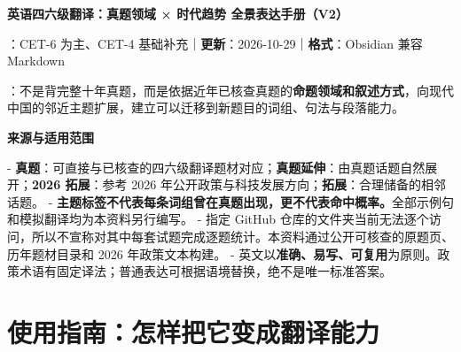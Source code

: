 \documentclass[a4paper,11pt,UTF8,fontset=none]{ctexart}
\begin{document}
\begin{center}\vspace*{4pt}
{\fontsize{18pt}{23pt}\selectfont\bfseries 英语四六级翻译：真题领域 × 时代趋势 全景表达手册（V2）\par}
\vspace{3pt}{\color{AccentBlue}\rule{0.82\linewidth}{1pt}}\end{center}

\begin{tcolorbox}[enhanced,breakable,boxrule=0.35pt,colback=VeryPaleBlue,colframe=AccentBlue!40,left=7pt,right=7pt,top=4pt,bottom=4pt,borderline west={2pt}{0pt}{AccentBlue},before skip=4pt,after skip=6pt]
：CET-6 为主、CET-4 基础补充｜{\bfseries 更新}：2026-10-29｜{\bfseries 格式}：Obsidian 兼容 Markdown\par

：不是背完整十年真题，而是依据近年已核查真题的{\bfseries 命题领域和叙述方式}，向现代中国的邻近主题扩展，建立可以迁移到新题目的词组、句法与段落能力。\par


\end{tcolorbox}

\begin{tcolorbox}[enhanced,breakable,boxrule=0.35pt,colback=VeryPaleBlue,colframe=AccentBlue!40,left=7pt,right=7pt,top=4pt,bottom=4pt,borderline west={2pt}{0pt}{AccentBlue},before skip=4pt,after skip=6pt]
{\bfseries\color{AccentBlue} 来源与适用范围}\par\vspace{1pt}
\noindent - {\bfseries 真题}：可直接与已核查的四六级翻译题材对应；{\bfseries 真题延伸}：由真题话题自然展开；{\bfseries 2026 拓展}：参考 2026 年公开政策与科技发展方向；{\bfseries 拓展}：合理储备的相邻话题。 - {\bfseries 主题标签不代表每条词组曾在真题出现，更不代表命中概率。}全部示例句和模拟翻译均为本资料另行编写。 - 指定 GitHub 仓库的文件夹当前无法逐个访问，所以不宣称对其中每套试题完成逐题统计。本资料通过公开可核查的原题页、历年题材目录和 2026 年政策文本构建。 - 英文以{\bfseries 准确、易写、可复用}为原则。政策术语有固定译法；普通表达可根据语境替换，绝不是唯一标准答案。\par


\end{tcolorbox}

\begingroup\fontsize{10.5pt}{13pt}\selectfont\setlength{\parskip}{0pt}\tableofcontents\endgroup\vspace{4pt}
\section{使用指南：怎样把它变成翻译能力}
\end{document}
